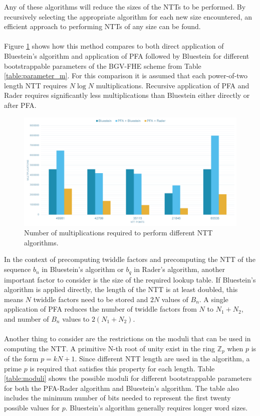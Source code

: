 \documentclass[english,master=eelt,masteroption=ec]{kulemt}
\begin{document}
Any of these algorithms will reduce the sizes of the NTTs to be performed. By recursively selecting the appropriate algorithm for each new size encountered, an efficient approach to performing NTTs of any size can be found. \cite{Parker1995UnusuallengthNT}
\\\\
Figure \ref{comparison_algorithm_multiplicatons} shows how this method compares to both direct application of Bluestein's algorithm and application of PFA followed by Bluestein for different bootstrappable parameters of the BGV-FHE scheme from Table \ref{table:parameter_m}. For this comparison it is assumed that each power-of-two length NTT requires $N \log N$ multiplications. Recursive application of PFA and Rader requires significantly less multiplications than Bluestein either directly or after PFA. 

\begin{figure}[h]
\includegraphics[width=\textwidth]{img/comparison_algorithm_multiplications.png}
\caption{Number of multiplications required to perform different NTT algorithms.}
\label{comparison_algorithm_multiplicatons}
\end{figure}

In the context of precomputing twiddle factors and precomputing the NTT of the sequence $b_n$ in Bluestein's algorithm or $b_q$ in Rader's algorithm, another important factor to consider is the size of the required lookup table. If Bluestein's algorithm is applied directly, the length of the NTT is at least doubled, this means $N$ twiddle factors need to be stored and $2N$ values of $B_n$. A single application of PFA reduces the number of twiddle factors from $N$ to $N_1 + N_2$, and number of $B_n$ values to $2\left(N_1 + N_2\right)$.
\\\\
Another thing to consider are the restrictions on the moduli that can be used in computing the NTT. A primitive N-th root of unity exist in the ring $\mathbb{Z}_p$ when $p$ is of the form $p = kN + 1$. Since different NTT length are used in the algorithm, a prime $p$ is required that satisfies this property for each length. Table \ref{table:moduli} shows the possible moduli for different bootstrappable parameters for both the PFA-Rader algorithm and Bluestein's algorithm. The table also includes the minimum number of bits needed to represent the first twenty possible values for $p$. Bluestein's algorithm generally requires longer word sizes.
\end{document}
